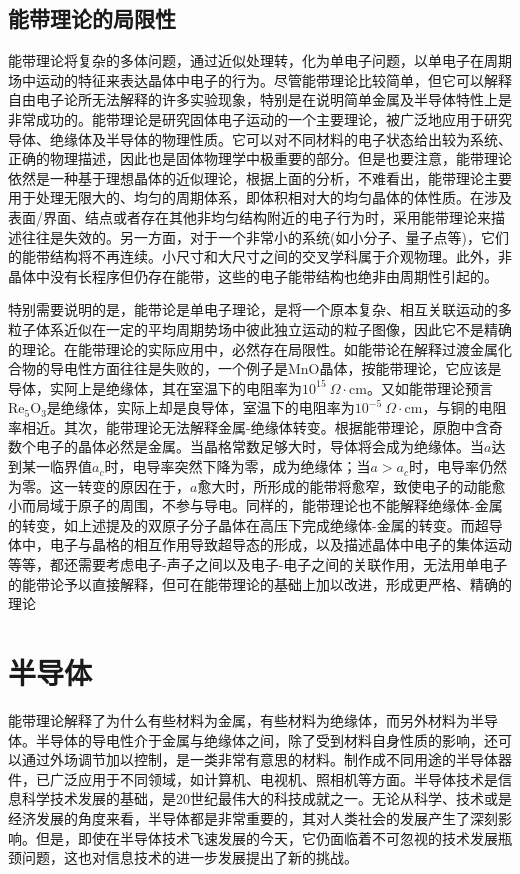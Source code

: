 \subsection{能带理论的局限性} 
能带理论将复杂的多体问题，通过近似处理转，化为单电子问题，以单电子在周期场中运动的特征来表达晶体中电子的行为。尽管能带理论比较简单，但它可以解释自由电子论所无法解释的许多实验现象，特别是在说明简单金属及半导体特性上是非常成功的。能带理论是研究固体电子运动的一个主要理论，被广泛地应用于研究导体、绝缘体及半导体的物理性质。它可以对不同材料的电子状态给出较为系统、正确的物理描述，因此也是固体物理学中极重要的部分。但是也要注意，能带理论依然是一种基于理想晶体的近似理论，根据上面的分析，不难看出，能带理论主要用于处理无限大的、均匀的周期体系，即体积相对大的均匀晶体的体性质。在涉及表面/界面、结点或者存在其他非均匀结构附近的电子行为时，采用能带理论来描述往往是失效的。另一方面，对于一个非常小的系统(如小分子、量子点等)，它们的能带结构将不再连续。小尺寸和大尺寸之间的交叉学科属于介观物理。此外，非晶体中没有长程序但仍存在能带，这些的电子能带结构也绝非由周期性引起的。

特别需要说明的是，能带论是单电子理论，是将一个原本复杂、相互关联运动的多粒子体系近似在一定的平均周期势场中彼此独立运动的粒子图像，因此它不是精确的理论。在能带理论的实际应用中，必然存在局限性。如能带论在解释过渡金属化合物的导电性方面往往是失败的，一个例子是MnO晶体，按能带理论，它应该是导体，实阿上是绝缘体，其在室温下的电阻率为$10^{15}~\Omega\cdot\mathrm{cm}$。又如能带理论预言$\mathrm{Re}_5\mathrm{O}_3$是绝缘体，实际上却是良导体，室温下的电阻率为$10^{-5}~\Omega\cdot\mathrm{cm}$，与铜的电阻率相近。其次，能带理论无法解释金属-绝缘体转变。根据能带理论，原胞中含奇数个电子的晶体必然是金属。当晶格常数足够大时，导体将会成为绝缘体。当$a$达到某一临界值$a_c$时，电导率突然下降为零，成为绝缘体；当$a>a_c$时，电导率仍然为零。这一转变的原因在于，$a$愈大时，所形成的能带将愈窄，致使电子的动能愈小而局域于原子的周围，不参与导电。同样的，能带理论也不能解释绝缘体-金属的转变，如上述提及的双原子分子晶体在高压下完成绝缘体-金属的转变。而超导体中，电子与晶格的相互作用导致超导态的形成，以及描述晶体中电子的集体运动等等，都还需要考虑电子-声子之间以及电子-电子之间的关联作用，无法用单电子的能带论予以直接解释，但可在能带理论的基础上加以改进，形成更严格、精确的理论

\section{半导体} 
能带理论解释了为什么有些材料为金属，有些材料为绝缘体，而另外材料为半导体。半导体的导电性介于金属与绝缘体之间，除了受到材料自身性质的影响，还可以通过外场调节加以控制，是一类非常有意思的材料。制作成不同用途的半导体器件，已广泛应用于不同领域，如计算机、电视机、照相机等方面。半导体技术是信息科学技术发展的基础，是20世纪最伟大的科技成就之一。无论从科学、技术或是经济发展的角度来看，半导体都是非常重要的，其对人类社会的发展产生了深刻影响。但是，即使在半导体技术飞速发展的今天，它仍面临着不可忽视的技术发展瓶颈问题，这也对信息技术的进一步发展提出了新的挑战。

